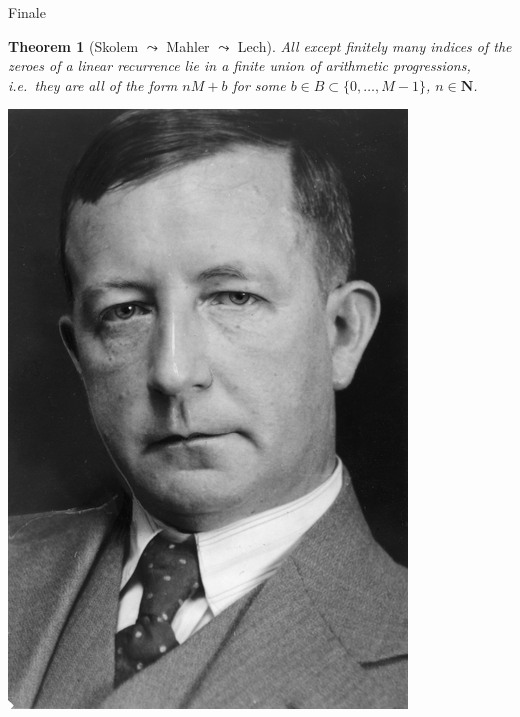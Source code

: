 \documentclass[notheorems]{beamer}
\theoremstyle{plain}
\newtheorem{theorem}{Theorem}[section]
\theoremstyle{definition}
\theoremstyle{definition}
\theoremstyle{definition}
\newcommand{\NN}{\mathbf{N}}
\begin{document}
\begin{frame}{Finale}
\begin{theorem}[{Skolem \(\leadsto\) Mahler \(\leadsto\) Lech}]
All except finitely many indices of the zeroes of a linear recurrence lie in a finite union of arithmetic progressions, i.e.\ they are all of the form \(nM + b\) for some \(b \in B \subset \{0, \ldots, M-1\}\), \(n \in \NN\).%
\end{theorem}
\pause
\includegraphics[height = 0.6\textheight]{skolem.jpeg}
\end{frame}
\end{document}
